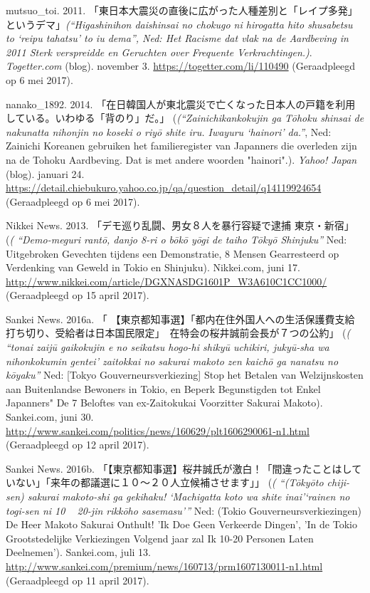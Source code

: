 \documentclass[10.5pt,dutch,]{article}
\begin{document}
\hypertarget{ref-mutsuoux5ftoiux5fhigashinihonux5f2011}{}
mutsuo_toi. 2011. 「東日本大震災の直後に広がった人種差別と「レイプ多発」というデマ」\emph{(“Higashinihon daishinsai no chokugo ni hirogatta hito shusabetsu to `reipu tahatsu’ to iu dema”, Ned: Het Racisme dat vlak na de Aardbeving in 2011 Sterk verspreidde en Geruchten over Frequente Verkrachtingen.)}. \emph{Togetter.com} (blog). november 3. \url{https://togetter.com/li/110490} (Geraadpleegd op 6 mei 2017).

\hypertarget{ref-nanakoux5f1892ux5fzainichikankokujinux5f2014}{}
nanako_1892. 2014. 「在日韓国人が東北震災で亡くなった日本人の戸籍を利用している。いわゆる「背のり」だ。」 (\emph{(“Zainichikankokujin ga Tōhoku shinsai de nakunatta nihonjin no koseki o riyō shite iru. Iwayuru `hainori’ da.”}, Ned: Zainichi Koreanen gebruiken het familieregister van Japanners die overleden zijn na de Tohoku Aardbeving. Dat is met andere woorden "hainori".). \emph{Yahoo! Japan} (blog). januari 24. \url{https://detail.chiebukuro.yahoo.co.jp/qa/question_detail/q14119924654} (Geraadpleegd op 6 mei 2017).

\hypertarget{ref-nikkeiux5fnewsux5fdemo-meguriux5f2013}{}
Nikkei News. 2013. 「デモ巡り乱闘、男女８人を暴行容疑で逮捕 東京・新宿」 (\emph{( “Demo-meguri rantō, danjo 8-ri o bōkō yōgi de taiho Tōkyō Shinjuku”} Ned: Uitgebroken Gevechten tijdens een Demonstratie, 8 Mensen Gearresteerd op Verdenking van Geweld in Tokio en Shinjuku). Nikkei.com, juni 17. \url{http://www.nikkei.com/article/DGXNASDG1601P_W3A610C1CC1000/} (Geraadpleegd op 15 april 2017).

\hypertarget{ref-sankeiux5fnewsux5ftokyochiji-senux5f2016}{}
Sankei News. 2016a. 「 【東京都知事選】「都内在住外国人への生活保護費支給打ち切り、受給者は日本国民限定」　在特会の桜井誠前会長が７つの公約」 (\emph{( “tonai zaijū gaikokujin e no seikatsu hogo-hi shikyū uchikiri, jukyū-sha wa nihonkokumin gentei’ zaitokkai no sakurai makoto zen kaichō ga nanatsu no kōyaku”} Ned: [Tokyo Gouverneursverkiezing] Stop het Betalen van Welzijnskosten aan Buitenlandse Bewoners in Tokio, en Beperk Begunstigden tot Enkel Japanners" De 7 Beloftes van ex-Zaitokukai Voorzitter Sakurai Makoto). Sankei.com, juni 30. \url{http://www.sankei.com/politics/news/160629/plt1606290061-n1.html} (Geraadpleegd op 12 april 2017).

\hypertarget{ref-sankeiux5fnewsux5ftokyochiji-senux5f2016-1}{}
Sankei News. 2016b. 「【東京都知事選】桜井誠氏が激白！「間違ったことはしていない」「来年の都議選に１０～２０人立候補させます」」 (\emph{( “(Tōkyōto chiji-sen) sakurai makoto-shi ga gekihaku! `Machigatta koto wa shite inai’`rainen no togi-sen ni 10 ~ 20-jin rikkōho sasemasu’”} Ned: (Tokio Gouverneursverkiezingen) De Heer Makoto Sakurai Onthult! 'Ik Doe Geen Verkeerde Dingen', 'In de Tokio Grootstedelijke Verkiezingen Volgend jaar zal Ik 10-20 Personen Laten Deelnemen'). Sankei.com, juli 13. \url{http://www.sankei.com/premium/news/160713/prm1607130011-n1.html} (Geraadpleegd op 11 april 2017).
\end{document}

